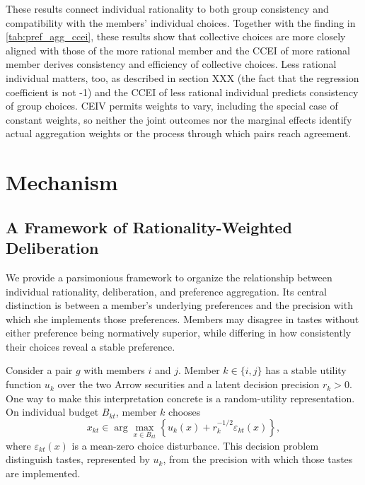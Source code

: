 \documentclass[11 pt]{article}
\begin{document}
These results connect individual rationality to both group consistency and compatibility with the members' individual choices. Together with the finding in \autoref{tab:pref_agg_ccei}, these results show that collective choices are more closely aligned with those of the more rational member and the CCEI of more rational member derives consistency and efficiency of collective choices. Less rational individual matters, too, as described in section XXX (the fact that the regression coefficient is not -1) and the CCEI of less rational individual predicts consistency of group choices. CEIV permits weights to vary, including the special case of constant weights, so neither the joint outcomes nor the marginal effects identify actual aggregation weights or the process through which pairs reach agreement.

\section{Mechanism}

\subsection{A Framework of Rationality-Weighted Deliberation}
\label{sec:framework}

We provide a parsimonious framework to organize the relationship between individual rationality, deliberation, and preference aggregation. Its central distinction is between a member's underlying preferences and the precision with which she implements those preferences. Members may disagree in tastes without either preference being normatively superior, while differing in how consistently their choices reveal a stable preference.

Consider a pair $g$ with members $i$ and $j$. Member $k\in\{i,j\}$ has a stable utility function $u_k$ over the two Arrow securities and a latent decision precision $r_k>0$. One way to make this interpretation concrete is a random-utility representation. On individual budget $B_{kt}$, member $k$ chooses
\begin{equation}
    x_{kt}\in\arg\max_{x\in B_{kt}}
    \left\{u_k(x)+r_k^{-1/2}\varepsilon_{kt}(x)\right\},
    \label{eq:random_utility_appendix}
\end{equation}
where $\varepsilon_{kt}(x)$ is a mean-zero choice disturbance. This decision problem distinguish tastes, represented by $u_k$, from the precision with which those tastes are implemented.
\end{document}
